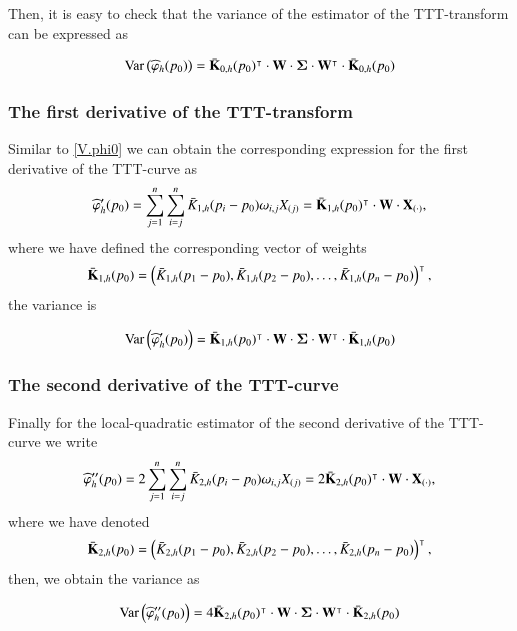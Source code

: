 \documentclass[preprint,12pt]{elsarticle}
\begin{document}
Then, it is easy to check that the variance of the estimator of the TTT-transform can be expressed as 

\begin{equation}\label{V.phi0}
{\rm Var} \left(\widehat{\varphi}_h(p_0)\right)= \bar{\bf K}_{0,h}(p_0)^{\intercal}\cdot {\bf W} \cdot {\boldsymbol{\Sigma}}\cdot  {\bf W}^{\intercal}\cdot \bar{\bf K}_{0,h}(p_0)
\end{equation}


\subsubsection*{The first derivative of the TTT-transform}


\noindent Similar to \eqref{V.phi0}  we can obtain the corresponding expression for the first derivative of the TTT-curve as
\begin{equation*}
\widehat{\varphi}'_h(p_0)=  \sum_{j=1}^n \sum_{i=j}^n \bar{K}_{1,h}(p_i-p_0)\omega_{i,j}X_{(j)}=\bar{\bf K}_{1,h}(p_0)^{\intercal} \cdot {\bf W} \cdot{\bf X}_{(\cdot)}, 
\end{equation*}
where we have defined the corresponding vector of weights 
$$\bar{\bf K}_{1,h}(p_0)=\left(\bar{ K}_{1,h}(p_1-p_0), \bar{ K}_{1,h}(p_2-p_0),\ldots,\bar{ K}_{1,h}(p_n-p_0)\right)^{\intercal},$$
the variance is 

\begin{equation}\label{V.phi1}
{\rm Var} \left(\widehat{\varphi}'_h(p_0)\right)= \bar{\bf K}_{1,h}(p_0)^{\intercal}\cdot {\bf W} \cdot {\boldsymbol{\Sigma}}\cdot  {\bf W}^{\intercal}\cdot \bar{\bf K}_{1,h}(p_0)
\end{equation}
\subsubsection*{The second derivative of the TTT-curve}
\noindent Finally for the local-quadratic estimator of the second derivative of the TTT-curve we write
\begin{equation*}
\widehat{\varphi}''_h(p_0)= 2 \sum_{j=1}^n \sum_{i=j}^n \bar{K}_{2,h}(p_i-p_0)\omega_{i,j}X_{(j)}=2 \bar{\bf K}_{2,h}(p_0)^{\intercal} \cdot {\bf W} \cdot{\bf X}_{(\cdot)}, 
\end{equation*}
where we have denoted 
$$\bar{\bf K}_{2,h}(p_0)=\left(\bar{ K}_{2,h}(p_1-p_0), \bar{ K}_{2,h}(p_2-p_0),\ldots,\bar{ K}_{2,h}(p_n-p_0)\right)^{\intercal},$$
then,  we obtain the variance as 

\begin{equation}\label{V.phi2}
{\rm Var} \left(\widehat{\varphi}''_h(p_0)\right)=4  \bar{\bf K}_{2,h}(p_0)^{\intercal}\cdot {\bf W} \cdot {\boldsymbol{\Sigma}}\cdot  {\bf W}^{\intercal}\cdot \bar{\bf K}_{2,h}(p_0)
\end{equation}
\end{document}
